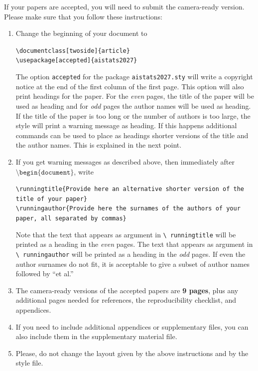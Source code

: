 \documentclass[twoside]{article}
\begin{document}
If your papers are accepted, you will need to submit the camera-ready version. Please make sure that you follow these instructions:
\begin{enumerate}
    \item Change the beginning of your document to
    \begin{flushleft}
    \texttt{\textbackslash documentclass[twoside]\{article\}}\\
    \texttt{\textbackslash usepackage[accepted]\{aistats2027\}}
    \end{flushleft}
    The option \texttt{accepted} for the package
    \texttt{aistats2027.sty} will write a copyright notice at the end of
    the first column of the first page. This option will also print
    headings for the paper.  For the \emph{even} pages, the title of
    the paper will be used as heading and for \emph{odd} pages the
    author names will be used as heading.  If the title of the paper
    is too long or the number of authors is too large, the style will
    print a warning message as heading. If this happens additional
    commands can be used to place as headings shorter versions of the
    title and the author names. This is explained in the next point.
    \item  If you get warning messages as described above, then
    immediately after $\texttt{\textbackslash
    begin\{document\}}$, write
    \begin{flushleft}
    \texttt{\textbackslash runningtitle\{Provide here an alternative
    shorter version of the title of your paper\}}\\
    \texttt{\textbackslash runningauthor\{Provide here the surnames of
    the authors of your paper, all separated by commas\}}
    \end{flushleft}
    Note that the text that appears as argument in \texttt{\textbackslash
      runningtitle} will be printed as a heading in the \emph{even}
    pages. The text that appears as argument in \texttt{\textbackslash
      runningauthor} will be printed as a heading in the \emph{odd}
    pages.  If even the author surnames do not fit, it is acceptable
    to give a subset of author names followed by ``et al.''


    \item The camera-ready versions of the accepted papers are \textbf{9
      pages}, plus any additional pages needed for references, the
      reproducibility checklist, and appendices.

    \item If you need to include additional appendices or supplementary files,
      you can also include them in the supplementary material file.

    \item Please, do not change the layout given by the above
      instructions and by the style file.

\end{enumerate}
\end{document}
